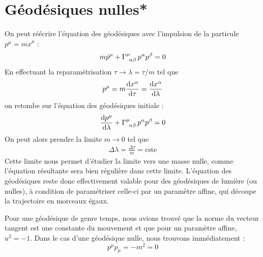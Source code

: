 \section{Géodésiques nulles*}
On peut réécrire l'équation des géodésiques avec l'impulsion de la particule $p^\mu = m \dot{x}^\mu$ :
\begin{equation}
    m \dot{p}^\mu + \Gamma\indices{^\mu_{\!\alpha\beta}} \,p^\alpha p^\beta = 0
\end{equation}
En effectuant la reparamétrisation $\tau \to \lambda = \tau/m$ tel que
\begin{equation}
    p^\mu = m \frac{\mathrm{d} x^\alpha}{\mathrm{d} \tau} = \frac{\mathrm{d} x^\alpha}{\mathrm{d} \lambda}
\end{equation}
on retombe sur l'équation des géodésiques initiale :
\begin{align}
    \frac{\td p^\mu}{\td \lambda} + \Gamma\indices{^\mu_{\!\alpha\beta}} \,p^\alpha p^\beta = 0
\end{align}
On peut alors prendre la limite $m \to 0$ tel que
\begin{align}
    \Delta \lambda = \frac{\Delta \tau}{m} = \text{cste}
 \end{align}
 Cette limite nous permet d'étudier la limite vers une masse nulle, comme l'équation résultante sera bien régulière dans cette limite. L'équation des géodésiques reste donc effectivement valable pour des géodésiques de lumière (ou nulles), à condition de paramétriser celle-ci par un paramètre affine, qui découpe la trajectoire en morceaux égaux.
 \begin{rmk}
     Pour une géodésique de genre temps, nous avions trouvé que la norme du vecteur tangent est une constante du mouvement et que pour un paramètre affine, $u^2 = -1$. Dans le cas d'une géodésique nulle, nous trouvons immédiatement :
     \begin{equation}
         p^\mu p_\mu = -m^2 = 0
     \end{equation}
 \end{rmk}
